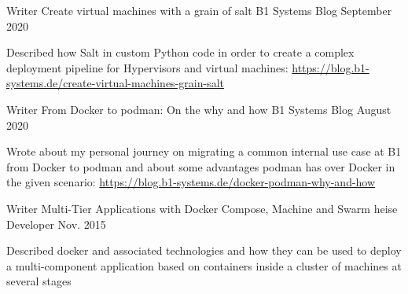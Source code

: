 {}


\begin{cventries}

  \cventry
    {Writer} %
    {Create virtual machines with a grain of salt} %
    {B1 Systems Blog} %
    {September 2020} %
    {
      \begin{cvitems} %
        \item {Described how Salt in custom Python code in order to create a complex deployment
          pipeline for Hypervisors and virtual machines:
          \url{https://blog.b1-systems.de/create-virtual-machines-grain-salt}}
      \end{cvitems}
    }
  \cventry
    {Writer} %
    {From Docker to podman: On the why and how} %
    {B1 Systems Blog} %
    {August 2020} %
    {
      \begin{cvitems} %
        \item {Wrote about my personal journey on migrating a common internal use case at B1 from
          Docker to podman and about some advantages podman has over Docker in the given scenario:
          \url{https://blog.b1-systems.de/docker-podman-why-and-how}
          }
      \end{cvitems}
    }
  \cventry
    {Writer} %
    {Multi-Tier Applications with Docker Compose, Machine and Swarm} %
    {heise Developer} %
    {Nov. 2015} %
    {
      \begin{cvitems} %
        \item {Described docker and associated technologies and how they can be used to deploy a multi-component application based on containers inside a cluster of machines at several stages}
      \end{cvitems}
    }


\end{cventries}
